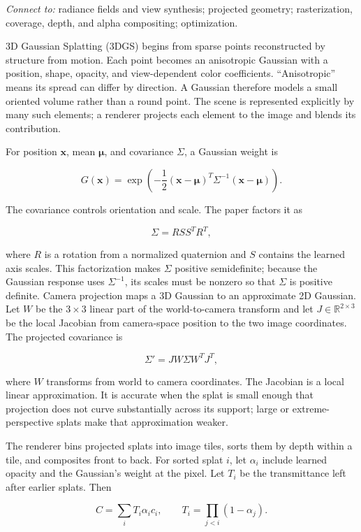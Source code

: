 \emph{Connect to:} radiance fields and view synthesis; projected geometry; rasterization, coverage, depth, and alpha compositing; optimization.

3D Gaussian Splatting (3DGS) begins from sparse points reconstructed by structure from motion. Each point becomes an anisotropic Gaussian with a position, shape, opacity, and view-dependent color coefficients. ``Anisotropic'' means its spread can differ by direction. A Gaussian therefore models a small oriented volume rather than a round point. The scene is represented explicitly by many such elements; a renderer projects each element to the image and blends its contribution.

For position \(\mathbf{x}\), mean \(\boldsymbol\mu\), and covariance \(\Sigma\), a Gaussian weight is

\[G(\mathbf{x})=\exp\left(-\frac{1}{2}(\mathbf{x}-\boldsymbol\mu)^T\Sigma^{-1}(\mathbf{x}-\boldsymbol\mu)\right).\]

The covariance controls orientation and scale. The paper factors it as

\[\Sigma=R S S^T R^T,\]

where \(R\) is a rotation from a normalized quaternion and \(S\) contains the learned axis scales. This factorization makes \(\Sigma\) positive semidefinite; because the Gaussian response uses \(\Sigma^{-1}\), its scales must be nonzero so that \(\Sigma\) is positive definite. Camera projection maps a 3D Gaussian to an approximate 2D Gaussian. Let \(W\) be the \(3\times3\) linear part of the world-to-camera transform and let \(J\in\mathbb{R}^{2\times3}\) be the local Jacobian from camera-space position to the two image coordinates. The projected covariance is

\[\Sigma'=J W\Sigma W^TJ^T,\]

where \(W\) transforms from world to camera coordinates. The Jacobian is a local linear approximation. It is accurate when the splat is small enough that projection does not curve substantially across its support; large or extreme-perspective splats make that approximation weaker.

The renderer bins projected splats into image tiles, sorts them by depth within a tile, and composites front to back. For sorted splat \(i\), let \(\alpha_i\) include learned opacity and the Gaussian's weight at the pixel. Let \(T_i\) be the transmittance left after earlier splats. Then

\[C=\sum_i T_i\alpha_i c_i,\qquad T_i=\prod_{j<i}(1-\alpha_j).\]

